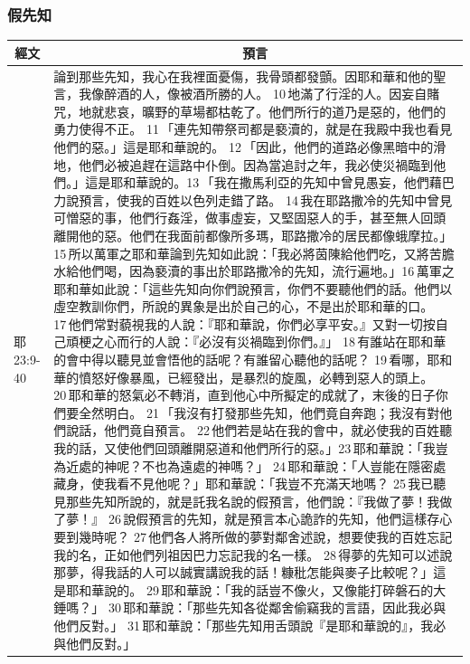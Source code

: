 \subsubsection{假先知}
\begin{table}[H]
\centering
\begin{tabular}{p{}|p{}}\hline\hline
\multicolumn{1}{c|}{經文}&\multicolumn{1}{c}{預言}\\\hline

耶23:9-40&論到那些先知，我心在我裡面憂傷，我骨頭都發顫。因耶和華和他的聖言，我像醉酒的人，像被酒所勝的人。 10 地滿了行淫的人。因妄自賭咒，地就悲哀，曠野的草場都枯乾了。他們所行的道乃是惡的，他們的勇力使得不正。 11 「連先知帶祭司都是褻瀆的，就是在我殿中我也看見他們的惡。」這是耶和華說的。 12 「因此，他們的道路必像黑暗中的滑地，他們必被追趕在這路中仆倒。因為當追討之年，我必使災禍臨到他們。」這是耶和華說的。13 「我在撒馬利亞的先知中曾見愚妄，他們藉巴力說預言，使我的百姓以色列走錯了路。 14 我在耶路撒冷的先知中曾見可憎惡的事，他們行姦淫，做事虛妄，又堅固惡人的手，甚至無人回頭離開他的惡。他們在我面前都像所多瑪，耶路撒冷的居民都像蛾摩拉。」 15 所以萬軍之耶和華論到先知如此說：「我必將茵陳給他們吃，又將苦膽水給他們喝，因為褻瀆的事出於耶路撒冷的先知，流行遍地。」16 萬軍之耶和華如此說：「這些先知向你們說預言，你們不要聽他們的話。他們以虛空教訓你們，所說的異象是出於自己的心，不是出於耶和華的口。 17 他們常對藐視我的人說：『耶和華說，你們必享平安。』又對一切按自己頑梗之心而行的人說：『必沒有災禍臨到你們。』」 18 有誰站在耶和華的會中得以聽見並會悟他的話呢？有誰留心聽他的話呢？ 19 看哪，耶和華的憤怒好像暴風，已經發出，是暴烈的旋風，必轉到惡人的頭上。 20 耶和華的怒氣必不轉消，直到他心中所擬定的成就了，末後的日子你們要全然明白。 21 「我沒有打發那些先知，他們竟自奔跑；我沒有對他們說話，他們竟自預言。 22 他們若是站在我的會中，就必使我的百姓聽我的話，又使他們回頭離開惡道和他們所行的惡。」23 耶和華說：「我豈為近處的神呢？不也為遠處的神嗎？」 24 耶和華說：「人豈能在隱密處藏身，使我看不見他呢？」耶和華說：「我豈不充滿天地嗎？ 25 我已聽見那些先知所說的，就是託我名說的假預言，他們說：『我做了夢！我做了夢！』 26 說假預言的先知，就是預言本心詭詐的先知，他們這樣存心要到幾時呢？ 27 他們各人將所做的夢對鄰舍述說，想要使我的百姓忘記我的名，正如他們列祖因巴力忘記我的名一樣。 28 得夢的先知可以述說那夢，得我話的人可以誠實講說我的話！糠秕怎能與麥子比較呢？」這是耶和華說的。 29 耶和華說：「我的話豈不像火，又像能打碎磐石的大錘嗎？」 30 耶和華說：「那些先知各從鄰舍偷竊我的言語，因此我必與他們反對。」 31 耶和華說：「那些先知用舌頭說『是耶和華說的』，我必與他們反對。」 
\end{tabular}
\end{table}
